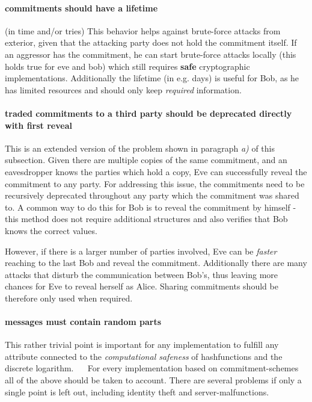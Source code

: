 \documentclass[conference]{IEEEtran}
\begin{document}
	\paragraph{commitments should have a lifetime} (in time and/or tries)
	This behavior helps against brute-force attacks from exterior, given that the attacking party does not hold the commitment itself. If an aggressor has the commitment, he can start brute-force attacks locally (this holds true for eve and bob) which still requires \textbf{safe} cryptographic implementations.
	Additionally the lifetime (in e.g. days) is useful for Bob, as he has limited resources and should only keep \textit{required} information. 
	\paragraph{traded commitments to a third party should be deprecated directly with first reveal} This is an extended version of the problem shown in paragraph \textit{a)} of this subsection. Given there are multiple copies of the same commitment, and an eavesdropper knows the parties which hold a copy, Eve can successfully reveal the commitment to any party. For addressing this issue, the commitments need to be recursively deprecated throughout any party which the commitment was shared to. A common way to do this for Bob is to reveal the commitment by himself - this method does not require additional structures and also verifies that Bob knows the correct values. 
	
	However, if there is a larger number of parties involved, Eve can be \textit{faster} reaching to the last Bob and reveal the commitment. Additionally there are many attacks that disturb the communication between Bob's, thus leaving more chances for Eve to reveal herself as Alice. Sharing commitments should be therefore only used when required. 
	\paragraph{messages must contain random parts} This rather trivial point is important for any implementation to fulfill any attribute connected to the \textit{computational safeness} of hashfunctions and the discrete logarithm.  
~\newline ~\newline
For every implementation based on commitment-schemes all of the above should be taken to account. There are several problems if only a single point is left out, including identity theft and server-malfunctions. 
\end{document}

